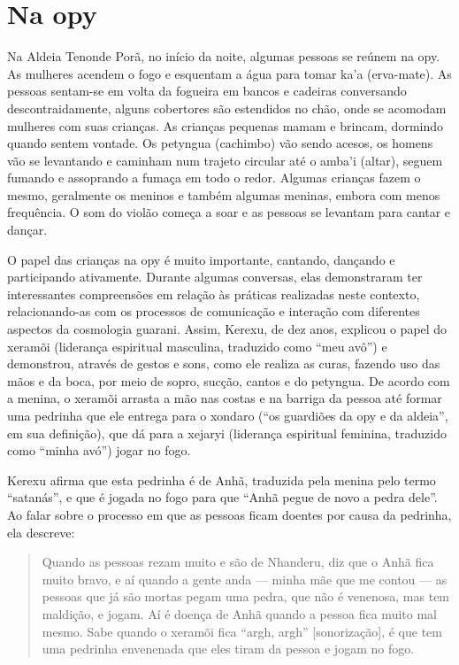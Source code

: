 \section{Na opy}

Na Aldeia Tenonde Porã, no início da noite, algumas pessoas se reúnem na
opy. As mulheres acendem o fogo e esquentam a água para tomar ka’a
(erva-mate). As pessoas sentam-se em volta da fogueira em bancos e
cadeiras conversando descontraidamente, alguns cobertores são
estendidos no chão, onde se acomodam mulheres com suas crianças. As
crianças pequenas mamam e brincam, dormindo quando sentem vontade. Os
petyngua (cachimbo) vão sendo acesos, os homens vão se levantando e
caminham num trajeto circular até o amba’i (altar), seguem fumando e
assoprando a fumaça em todo o redor. Algumas crianças fazem o mesmo,
geralmente os meninos e também algumas meninas, embora com menos
frequência. O som do violão começa a soar e as pessoas se levantam para
cantar e dançar. 

O papel das crianças na opy é muito importante, cantando, dançando e
participando ativamente. Durante algumas conversas, elas demonstraram
ter interessantes compreensões em relação às práticas realizadas neste
contexto, relacionando-as com os processos de comunicação e interação
com diferentes aspectos da cosmologia guarani. Assim, Kerexu, de dez
anos, explicou o papel do xeramõi (liderança espiritual masculina,
traduzido como ``meu avô'') e demonstrou, através de gestos e sons, como
ele realiza as curas, fazendo uso das mãos e da boca, por meio de
sopro, sucção, cantos e do petyngua. De acordo com a menina, o xeramõi
arrasta a mão nas costas e na barriga da pessoa até formar uma pedrinha
que ele entrega para o xondaro  (``os guardiões da opy e da aldeia'', em
sua definição), que dá para a xejaryi (liderança espiritual feminina,
traduzido como ``minha avó'') jogar no fogo. 

Kerexu afirma que esta pedrinha é de Anhã, traduzida pela menina pelo
termo ``satanás'', e que é jogada no fogo para que ``Anhã pegue de novo a
pedra dele''. Ao falar sobre o processo em que as pessoas ficam doentes
por causa da pedrinha, ela descreve:

\begin{quotation}
Quando as pessoas rezam muito e são de Nhanderu, diz que o Anhã fica
muito bravo, e aí quando a gente anda --- minha mãe que me contou --- as
pessoas que já são mortas pegam uma pedra, que não é venenosa, mas tem
maldição, e jogam. Aí é doença de Anhã quando a pessoa fica muito mal
mesmo. Sabe quando o xeramõi fica ``argh, argh'' [sonorização], é que tem
uma pedrinha envenenada que eles tiram da pessoa e jogam no fogo.
\end{quotation}

